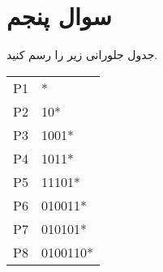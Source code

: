 \section{سوال پنجم}

جدول جلورانی  زیر را رسم کنید.

\begin{latin}
		\begin{tabular}{l l}
			P1 & * \\
			P2 & 10* \\
			P3 & 1001* \\
			P4 & 1011* \\
			P5 & 11101* \\
			P6 & 010011* \\
			P7 & 010101* \\
			P8 & 0100110* \\
		\end{tabular}
\end{latin}

\begin{qsolve}
	
\end{qsolve}